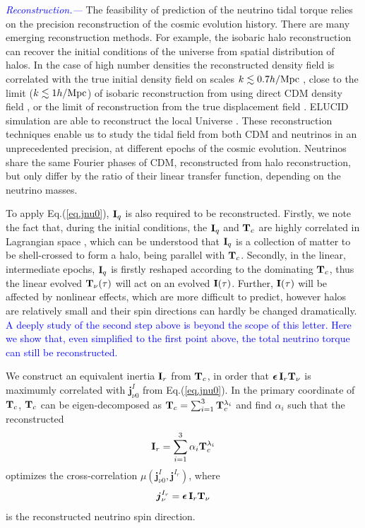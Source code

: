 \documentclass[aps,prd,twocolumn,amsmath,amssymb,amsfont,superscriptaddress]{revtex4-1}
\newcommand{\bs}{\boldsymbol}
\newcommand{\tcb}{\textcolor{blue}}
\begin{document}
\tcb{\textit{Reconstruction.---}} 
The feasibility of prediction of the neutrino tidal torque relies on the precision reconstruction of the cosmic evolution history. 
There are many emerging reconstruction methods. 
For example, the isobaric halo reconstruction can recover the initial conditions of the universe from spatial distribution of halos. 
In the case of high number densities the reconstructed density field is correlated with the true initial density field on scales $k\lesssim 0.7 h/{\rm Mpc}$ \citep{2017ApJ...847..110Y}, 
close to the limit ($k\lesssim 1 h/{\rm Mpc}$) of isobaric reconstruction from using direct CDM density field \citep{2017PhRvD..96l3502Z}, 
or the limit of reconstruction from the true displacement field \citep{2017PhRvD..95d3501Y}. 
ELUCID simulation are able to reconstruct the local Universe \citep{2014ApJ...794...94W}.
These reconstruction techniques enable us to study the tidal field from both CDM and neutrinos in an unprecedented precision, at different epochs of the cosmic evolution. 
Neutrinos share the same Fourier phases of CDM, reconstructed from halo reconstruction, but only differ by the ratio of their linear transfer function, depending on the neutrino masses.

To apply Eq.(\ref{eq.jnu0}), $\bold{I}_q$ is also required to be reconstructed. 
Firstly, we note the fact that, during the initial conditions, the $\bold{I}_q$ and $\bold{T}_c$ are highly correlated in Lagrangian space \citep{2000ApJ...532L...5L,2001ApJ...555..106L}, 
which can be understood that $\bold{I}_q$ is a collection of matter to be shell-crossed to form a halo, being parallel with $\bold{T}_c$.
Secondly, in the linear, intermediate epochs, $\bold{I}_q$ is firstly reshaped according to the dominating $\bold{T}_c$, thus the linear evolved $\bold{T}_\nu(\tau)$ will act on an evolved $\bold{I}(\tau)$.
Further, $\bold{I}(\tau)$ will be affected by nonlinear effects, which are more difficult to predict, however halos are relatively small and their spin directions can hardly be changed dramatically.
\tcb{A deeply study of the second step above is beyond the scope of this letter. Here we show that, even simplified to the first point above, the total neutrino torque can still be reconstructed.}

We construct an equivalent inertia $\bold{I}_r$ from $\bold{T}_c$, in order that $\bs{\epsilon}\,\bold{I}_r\bold{T}_\nu$ is maximumly correlated with $\bs{j}^I_{\nu 0}$ from Eq.(\ref{eq.jnu0}).
In the primary coordinate of $\bold{T}_c$, $\bold{T}_c$ can be eigen-decomposed as $\bold{T}_c=\sum_{i=1}^3\bold{T}^{\lambda_i}_c$ and find $\alpha_i$ such that the reconstructed
\begin{equation}\label{eq.Ir}
	\bold{I}_r=\sum_{i=1}^3\alpha_i\bold{T}^{\lambda_i}_c
\end{equation}
optimizes the cross-correlation $\mu(\bs{j}^I_{\nu 0},\bs{j}^{I_r})$, where
\begin{equation}\label{eq.jnuIr}
 	\bs{j}^{I_r}_\nu=\bs{\epsilon}\,\bold{I}_r\bold{T}_\nu
\end{equation}
is the reconstructed neutrino spin direction.
\end{document}

